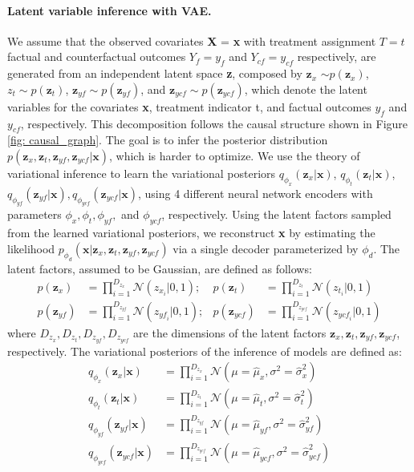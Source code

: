 \documentclass{amia}
\begin{document}
\paragraph*{Latent variable inference with VAE.}
We assume that the observed covariates \textbf{X} = \textbf{x} with treatment assignment $T = t$ factual and counterfactual outcomes $Y_f = y_f$ and $Y_{cf} = y_{cf}$ respectively, are generated from an independent latent space \textbf{z}, composed by $\textbf{z}_x$ $\sim p(\textbf{z}_x)$, $z_t \sim p(\textbf{z}_t)$, $\textbf{z}_{yf} \sim p(\textbf{z}_{yf})$, and $\textbf{z}_{ycf}\sim p(\textbf{z}_{ycf})$, which denote the latent variables for the covariates \textbf{x}, treatment indicator t, and factual outcomes $y_{f}$ and $y_{cf}$, respectively. This decomposition follows the causal structure shown in Figure \ref{fig: causal_graph}. The goal is to infer the posterior distribution $p(\textbf{z}_x, \textbf{z}_t, \textbf{z}_{yf}, \textbf{z}_{ycf}|\textbf{x})$, which is harder to optimize. We use the theory of variational inference \cite{blei2017variational} to learn the variational posteriors $q_{\phi_x}(\textbf{z}_x|\textbf{x})$, $q_{\phi_t}(\textbf{z}_t|\textbf{x})$, $q_{\phi_{yf}}(\textbf{z}_{yf}|\textbf{x}), q_{\phi_{ycf}}(\textbf{z}_{ycf}|\textbf{x})$, using 4 different neural network encoders with parameters $\phi_x, \phi_t, \phi_{yf},$ and $\phi_{ycf}$, respectively. Using the latent factors sampled from the learned variational posteriors, we reconstruct \textbf{x} by estimating the likelihood $p_{\phi_d}(\textbf{x}|\textbf{z}_x, \textbf{z}_t, \textbf{z}_{yf}, \textbf{z}_{ycf})$ via a single decoder parameterized by $\phi_d$. The latent factors, assumed to be Gaussian, are defined as follows:
\begin{align}
p(\textbf{z}_x) &= \prod_{i=1} ^ {D_{z_x}} \mathcal{N}(z_{x_i}|0, 1) ;
  &p(\textbf{z}_t) &= \prod_{i=1} ^ {D_{z_t}} \mathcal{N}(z_{t_i}|0, 1) \\
p(\textbf{z}_{yf}) &= \prod_{i=1} ^ {D_{z_{yf}}} \mathcal{N}(z_{{yf}_i}|0, 1) ;
  &p(\textbf{z}_{ycf}) &= \prod_{i=1} ^ {D_{z_{ycf}}} \mathcal{N}(z_{{ycf}_i}|0, 1)
\end{align}
where $D_{z_x}, D_{z_t}, D_{z_{yf}}, D_{z_{ycf}}$ are the dimensions of the latent factors $\textbf{z}_x, \textbf{z}_t, \textbf{z}_{yf}, \textbf{z}_{ycf}$, respectively. The variational posteriors of the inference of models are defined as:
\begin{align}
  q_{\phi_x}(\textbf{z}_x|\textbf{x}) &= \prod_{i=1} ^ {D_{z_x}} \mathcal{N}(\mu = \hat{\mu}_x, \sigma^2 = \hat{\sigma}_x^2) \\
  q_{\phi_t}(\textbf{z}_t|\textbf{x}) &= \prod_{i=1} ^ {D_{z_t}} \mathcal{N}(\mu = \hat{\mu}_t, \sigma^2 =\hat{\sigma}_t^2) \\
  q_{\phi_{yf}}(\textbf{z}_{yf}|\textbf{x}) &= \prod_{i=1} ^ {D_{z_{yf}}} \mathcal{N}(\mu = \hat{\mu}_{yf}, \sigma^2 = \hat{\sigma}_{yf}^2) \\
  q_{\phi_{ycf}}(\textbf{z}_{ycf}|\textbf{x}) &= \prod_{i=1} ^ {D_{z_{ycf}}} \mathcal{N}(\mu = \hat{\mu}_{ycf}, \sigma^2 = \hat{\sigma}_{ycf}^2)
  \label{equ: posterior}
\end{align}
\end{document}
